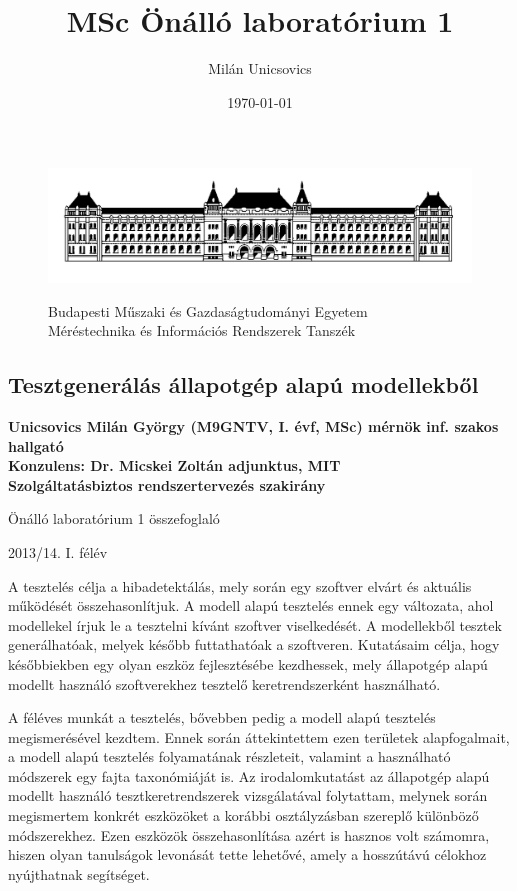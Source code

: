 \documentclass{article}
\author{Milán Unicsovics}
\title{MSc Önálló laboratórium 1}
\date{\today}
\begin{document}
\thispagestyle{empty}
\begin{figure}[htp]
\centering
\includegraphics[scale=0.3]{img/bme.png}
\begin{center}
Budapesti Műszaki és Gazdaságtudományi Egyetem\\
Méréstechnika és Információs Rendszerek Tanszék
\end{center}
\end{figure}
\vspace*{-0.1in}
\begin{center}
\subsection*{Tesztgenerálás állapotgép alapú modellekből}
{\bf
Unicsovics Milán György (M9GNTV, I. évf, MSc) mérnök inf. szakos hallgató\\[0.3cm]

Konzulens: Dr. Micskei Zoltán adjunktus, MIT\\[0.3cm]

Szolgáltatásbiztos rendszertervezés szakirány 

Önálló laboratórium 1 összefoglaló 

2013/14. I. félév
}
\end{center}
\vspace{0.5cm}

A tesztelés célja a hibadetektálás, mely során egy szoftver elvárt és aktuális működését összehasonlítjuk. A modell alapú tesztelés ennek egy változata, ahol modellekel írjuk le a tesztelni kívánt szoftver viselkedését. A modellekből tesztek generálhatóak, melyek később futtathatóak a szoftveren. Kutatásaim célja, hogy későbbiekben egy olyan eszköz fejlesztésébe kezdhessek, mely állapotgép alapú modellt használó szoftverekhez tesztelő keretrendszerként használható.

A féléves munkát a tesztelés, bővebben pedig a modell alapú tesztelés megismerésével kezdtem. Ennek során áttekintettem ezen területek alapfogalmait, a modell alapú tesztelés folyamatának részleteit, valamint a használható módszerek egy fajta taxonómiáját is. Az irodalomkutatást az állapotgép alapú modellt használó tesztkeretrendszerek vizsgálatával folytattam, melynek során megismertem konkrét eszközöket a korábbi osztályzásban szereplő különböző módszerekhez. Ezen eszközök összehasonlítása azért is hasznos volt számomra, hiszen olyan tanulságok levonását tette lehetővé, amely a hosszútávú célokhoz nyújthatnak segítséget.
\end{document}
